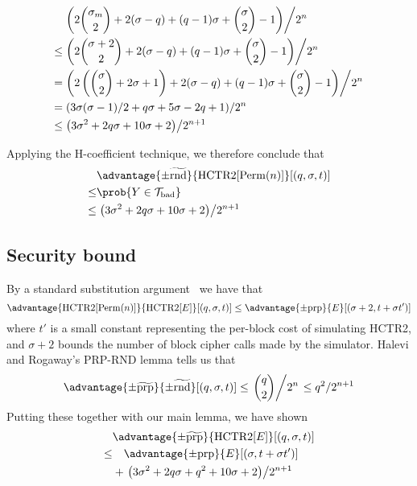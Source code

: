 \documentclass[hctr.tex]{subfiles}
\begin{document}
\begin{align*}
    & \left.\left(2\binom{\sigma_m}{2} + 2(\sigma - q) + (q-1)\sigma + \binom{\sigma}{2} -1\right)\middle/2^n\right. \\
    \leq & \left.\left(2\binom{\sigma + 2}{2} + 2(\sigma - q) + (q-1)\sigma + \binom{\sigma}{2} -1\right)\middle/2^n\right. \\
    = & \left.\left(2\left(\binom{\sigma}{2} + 2\sigma + 1\right) + 2(\sigma - q) + (q-1)\sigma + \binom{\sigma}{2} -1\right)\middle/2^n\right. \\
    = & \left.\left(3\sigma(\sigma - 1)/2 + q\sigma + 5\sigma - 2q + 1\right)\middle/2^n\right. \\
    \leq & \left.\left(3\sigma^2 + 2q\sigma + 10\sigma + 2\right)\middle/2^{n+1}\right. \\
\end{align*}

Applying the H-coefficient technique, we therefore conclude that
\begin{align*}
    & \advantage{\pm\widetilde{\mathrm{rnd}}}{\HCTR[\Perm(n)]}[(q, \sigma, t)] \\
    \leq & \prob{Y \in \Tb} \\
    \leq & \left.\left(3\sigma^2 + 2q\sigma + 10\sigma + 2\right)\middle/2^{n+1}\right.
\end{align*}

\subsection{Security bound}
By a standard substitution argument~\cite{cbcsec,concrete} we have that
\begin{displaymath}
    \advantage{\HCTR[\Perm(n)]}{\HCTR[E]}[(q, \sigma, t)]
    \leq \advantage{\pm \mathrm{prp}}{E}[(\sigma + 2, t + \sigma t')]
\end{displaymath}
where \(t'\) is a small constant
representing the per-block cost of simulating HCTR2, and
\(\sigma + 2\) bounds the number of block cipher calls made by the simulator.
Halevi and Rogaway's PRP-RND lemma
\cite[Appendix C, Lemma 6]{cmc} tells us that
\begin{displaymath}
    \advantage{\pm \widetilde{\mathrm{prp}}}{\pm\widetilde{\mathrm{rnd}}}[(q, \sigma, t)] 
    \leq \left.\binom{q}{2}\middle/2^n\right.
    \leq q^2/2^{n+1}
\end{displaymath}
Putting these together with our main lemma, we have shown
\begin{align*}
    &\advantage{\pm \widetilde{\mathrm{prp}}}{\HCTR[E]}[(q, \sigma, t)] \\
    \leq & \quad \advantage{\pm \mathrm{prp}}{E}[(\sigma, t + \sigma t')] \\
    &+ \left.\left(3\sigma^2 + 2q\sigma + q^2 + 10\sigma + 2\right)\middle/2^{n+1}\right. \\
\end{align*}
\end{document}
